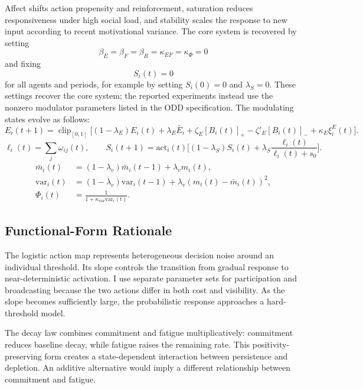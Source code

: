 \documentclass[11pt]{article}
\newcommand{\clip}{\operatorname{clip}_{[0,1]}}
\begin{document}
Affect shifts action propensity and reinforcement, saturation reduces responsiveness under high social load, and stability scales the response to new input according to recent motivational variance. The core system is recovered by setting
\[
\beta_E=\beta_F=\beta_R=\kappa_{EF}=\kappa_\Phi=0
\]
and fixing
\[
S_i(t)=0
\]
for all agents and periods, for example by setting $S_i(0)=0$ and $\lambda_S=0$. These settings recover the core system; the reported experiments instead use the nonzero modulator parameters listed in the ODD specification. The modulating states evolve as follows:
\begin{equation}\tag{17}\label{eq:emotion}
E_i(t{+}1)=\clip\!\Big[(1-\lambda_E)E_i(t)+\lambda_E\bar E_i+\zeta_E[B_i(t)]_+-\zeta'_E[B_i(t)]_-+\kappa_E\xi_i^E(t)\Big].
\end{equation}
\begin{equation}\tag{18}\label{eq:saturation}
\ell_i(t)=\sum_j\omega_{ij}(t),\qquad
S_i(t{+}1)=\mathrm{act}_i(t)\Big[(1-\lambda_S)S_i(t)+\lambda_S\frac{\ell_i(t)}{\ell_i(t)+s_0}\Big].
\end{equation}
\begin{equation}\tag{19}\label{eq:stability}
\begin{aligned}
\bar m_i(t)&=(1-\lambda_v)\bar m_i(t{-}1)+\lambda_vm_i(t),\\
\mathrm{var}_i(t)&=(1-\lambda_v)\mathrm{var}_i(t{-}1)+\lambda_v(m_i(t)-\bar m_i(t))^2,\\
\Phi_i(t)&=\frac{1}{1+\kappa_{\text{var}}\mathrm{var}_i(t)}.
\end{aligned}
\end{equation}

\subsection{Functional-Form Rationale}
The logistic action map represents heterogeneous decision noise around an individual threshold. Its slope controls the transition from gradual response to near-deterministic activation. I use separate parameter sets for participation and broadcasting because the two actions differ in both cost and visibility. As the slope becomes sufficiently large, the probabilistic response approaches a hard-threshold model.

The decay law combines commitment and fatigue multiplicatively: commitment reduces baseline decay, while fatigue raises the remaining rate. This positivity-preserving form creates a state-dependent interaction between persistence and depletion. An additive alternative would imply a different relationship between commitment and fatigue. 
\end{document}
